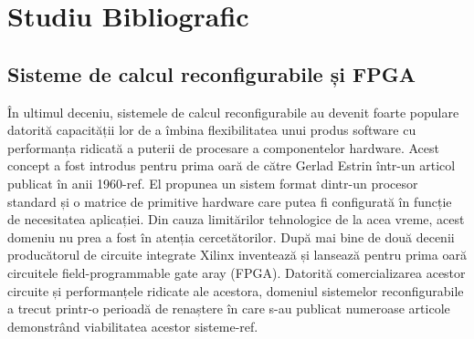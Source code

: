\documentclass[12pt,a4paper,twoside]{report}
\begin{document}
%
%
%
%


\chapter{Studiu Bibliografic}

\section{Sisteme de calcul reconfigurabile și FPGA}
În ultimul deceniu, sistemele de calcul reconfigurabile au devenit foarte populare datorită capacității lor de a îmbina flexibilitatea unui produs software cu performanța ridicată a puterii de procesare a componentelor hardware. Acest concept a fost introdus pentru prima oară de către Gerlad Estrin într-un articol publicat în anii 1960-ref. El propunea un sistem format dintr-un procesor standard și o matrice de primitive hardware care putea fi configurată în funcție de necesitatea aplicației. Din cauza limitărilor tehnologice de la acea vreme, acest domeniu nu prea a fost în atenția cercetătorilor. După mai bine de două decenii producătorul de circuite integrate Xilinx inventează și lansează pentru prima oară circuitele field-programmable gate aray (FPGA). Datorită comercializarea acestor circuite și performanțele ridicate ale acestora, domeniul sistemelor reconfigurabile a trecut printr-o perioadă de renaștere în care s-au publicat numeroase articole demonstrând viabilitatea acestor sisteme-ref. 
\end{document}
